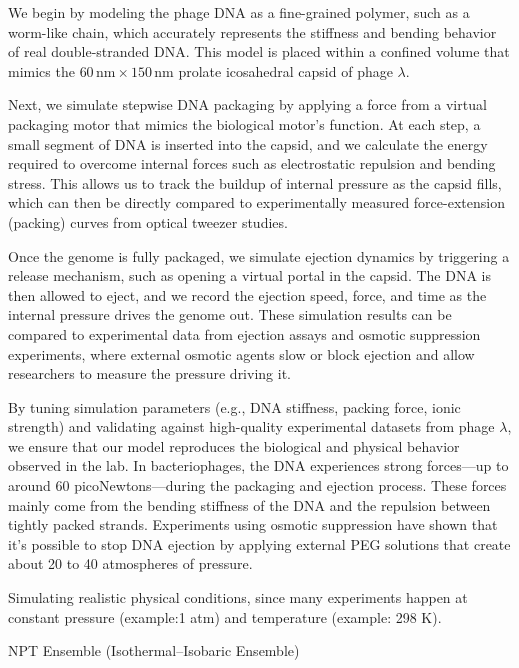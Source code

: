 \documentclass[12pt]{article}
\begin{document}
\begin{flushleft}
We begin by modeling the phage DNA as a fine-grained polymer, such as a worm-like chain, which accurately represents the stiffness and bending behavior of real double-stranded DNA. This model is placed within a confined volume that mimics the $60\,\text{nm} \times 150\,\text{nm}$ prolate icosahedral capsid of phage $\lambda$.
 


Next, we simulate stepwise DNA packaging by applying a force from a virtual packaging motor that mimics the biological motor’s function. At each step, a small segment of DNA is inserted into the capsid, and we calculate the energy required to overcome internal forces such as electrostatic repulsion and bending stress. This allows us to track the buildup of internal pressure as the capsid fills, which can then be directly compared to experimentally measured force-extension (packing) curves from optical tweezer studies.

Once the genome is fully packaged, we simulate ejection dynamics by triggering a release mechanism, such as opening a virtual portal in the capsid. The DNA is then allowed to eject, and we record the ejection speed, force, and time as the internal pressure drives the genome out. These simulation results can be compared to experimental data from ejection assays and osmotic suppression experiments, where external osmotic agents slow or block ejection and allow researchers to measure the pressure driving it.


By tuning simulation parameters (e.g., DNA stiffness, packing force, ionic strength) and validating against high-quality experimental datasets from phage $\lambda$, we ensure that our model reproduces the biological and physical behavior observed in the lab. In bacteriophages, the DNA experiences strong forces—up to around 60 picoNewtons—during the packaging and ejection process. These forces mainly come from the bending stiffness of the DNA and the repulsion between tightly packed strands. Experiments using osmotic suppression have shown that it's possible to stop DNA ejection by applying external PEG solutions that create about 20 to 40 atmospheres of pressure\cite{Grayson2006}.







Simulating realistic physical conditions, since many experiments happen at constant pressure (example:1 atm) and temperature  (example: 298 K).

\noindent NPT Ensemble (Isothermal–Isobaric Ensemble)


\end{flushleft}
\end{document}
